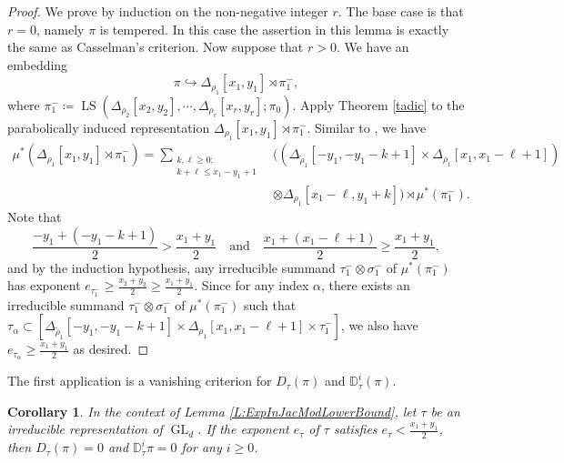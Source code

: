 \documentclass[11pt,letterpaper]{amsart}
\theoremstyle{plain}
\newcounter{theorem}[section]
\numberwithin{theorem}{section}
\numberwithin{equation}{subsection}
\newtheorem{Cor}[theorem]{Corollary}
\theoremstyle{remark}
\newcommand{\GL}{\operatorname{GL}}
\newcommand{\LS}{\operatorname{LS}} %
\newcommand{\D}{\mathbb{D}}
\begin{document}
\begin{proof}
We prove by induction on the non-negative integer $r$. The base case is that $r=0$, namely $\pi$ is tempered. In this case the assertion in this lemma is exactly the same as Casselman's criterion. Now suppose that $r>0$. We have an embedding
\[
    \pi\hookrightarrow \Delta_{\rho_1}[x_1,y_1] \rtimes \pi_1^-,
\]
where $\pi^-_1\coloneqq\LS\left(\Delta_{\rho_2}[x_2,y_2],\cdots,\Delta_{\rho_r}[x_r,y_r];\pi_0\right)$. Apply Theorem \ref{tadic} to the parabolically induced representation $\Delta_{\rho_1}[x_1,y_1] \rtimes \pi_1^-$. Similar to \cite[Cor. 2.9]{MR4055180}, we have
\begin{align*}
\mu^*\left(\Delta_{\rho_1}[x_1,y_1] \rtimes \pi_1^-\right) = \sum_{\substack{k,\ell\geq 0;\\ k+\ell\leq x_1-y_1+1}} &\Big(\left(\Delta_{\widetilde{\rho}_1}\left[-y_1,-y_1-k+1\right]\times\Delta_{\rho_1}\left[x_1,x_1-\ell+1\right]\right) \\
&\otimes \Delta_{\rho_1}\left[x_1-\ell, y_1+k\right]\Big)\rtimes \mu^*\left(\pi^-_1\right).   
\end{align*}
Note that
\[
    \frac{-y_1 + (-y_1-k+1)}{2} > \frac{x_1 + y_1}{2} \quad \text{and} \quad \frac{x_1 + (x_1-\ell+1)}{2} \geq \frac{x_1 + y_1}{2},
\] 
and by the induction hypothesis, any irreducible summand $\tau_1^-\otimes\sigma_1^-$ of $\mu^*\left(\pi^-_1\right)$ has exponent $e_{\tau_1^-}\geq \frac{x_2+y_2}{2}\geq\frac{x_1 + y_1}{2}$. Since for any index $\alpha$, there exists an irreducible summand $\tau_1^-\otimes\sigma_1^-$ of $\mu^*\left(\pi^-_1\right)$ such that $\tau_\alpha\subset \left[\Delta_{\widetilde{\rho}_1}\left[-y_1,-y_1-k+1\right]\times\Delta_{\rho_1}\left[x_1,x_1-\ell+1\right]\times \tau^-_1\right]$, we also have $e_{\tau_\alpha}\geq \frac{x_1+y_1}{2}$ as desired.

\end{proof}

\vskip 5pt

The first application is a vanishing criterion for $D_\tau(\pi)$ and $\D^i_\tau(\pi)$.

\begin{Cor}\label{C:VanishingLemma}
In the context of Lemma \ref{L:ExpInJacModLowerBound}, let $\tau$ be an irreducible representation of $\GL_d$. If the exponent $e_\tau$ of $\tau$ satisfies $e_\tau<\frac{x_1+y_1}{2}$, then $D_\tau(\pi)=0$ and $\D^i_{\tau}\pi = 0$ for any $i\geq 0$.
\end{Cor}

\vskip 5pt
\end{document}
